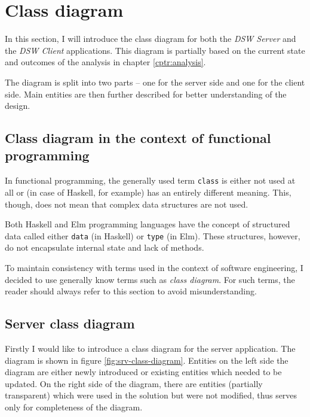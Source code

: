 \section{Class diagram}\label{sec:class-diagram}

In this section, I will introduce the class diagram for both the \textit{DSW Server} and the \textit{DSW Client} applications.
This diagram is partially based on the current state and outcomes of the analysis in chapter \ref{cptr:analysis}.

The diagram is split into two parts -- one for the server side and one for the client side.
Main entities are then further described for better understanding of the design.

\subsection{Class diagram in the context of functional programming}

In functional programming, the generally used term \texttt{class} is either not used at all or (in case of Haskell, for example) has an entirely different meaning.
This, though, does not mean that complex data structures are not used.

Both Haskell and Elm programming languages have the concept of structured data called either \texttt{data} (in Haskell) or \texttt{type} (in Elm).
These structures, however, do not encapsulate internal state and lack of methods.

To maintain consistency with terms used in the context of software engineering, I decided to use generally know terms such as \textit{class diagram}.
For such terms, the reader should always refer to this section to avoid misunderstanding.

\subsection{Server class diagram}

Firstly I would like to introduce a class diagram for the server application.
The diagram is shown in figure \ref{fig:srv-class-diagram}.
Entities on the left side the diagram are either newly introduced or existing entities which needed to be updated.
On the right side of the diagram, there are entities (partially transparent) which were used in the solution but were not modified, thus serves only for completeness of the diagram.


